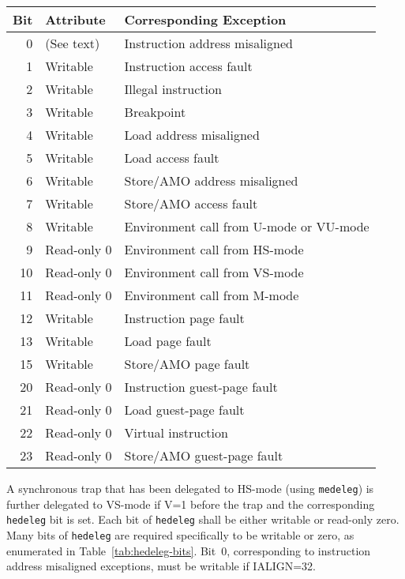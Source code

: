 \begin{table*}[h!]
\begin{center}
\begin{tabular}{|r|l|l|}
\hline
Bit & Attribute   & Corresponding Exception \\
\hline
 0  & (See text)  & Instruction address misaligned \\
 1  & Writable    & Instruction access fault \\
 2  & Writable    & Illegal instruction \\
 3  & Writable    & Breakpoint \\
 4  & Writable    & Load address misaligned \\
 5  & Writable    & Load access fault \\
 6  & Writable    & Store/AMO address misaligned \\
 7  & Writable    & Store/AMO access fault \\
 8  & Writable    & Environment call from U-mode or VU-mode \\
 9  & Read-only 0 & Environment call from HS-mode \\
10  & Read-only 0 & Environment call from VS-mode \\
11  & Read-only 0 & Environment call from M-mode \\
12  & Writable    & Instruction page fault \\
13  & Writable    & Load page fault \\
15  & Writable    & Store/AMO page fault \\
20  & Read-only 0 & Instruction guest-page fault \\
21  & Read-only 0 & Load guest-page fault \\
22  & Read-only 0 & Virtual instruction \\
23  & Read-only 0 & Store/AMO guest-page fault \\
\hline
\end{tabular}
\end{center}
\caption{Bits of {\tt hedeleg} that must be writable or must be read-only
zero.}
\label{tab:hedeleg-bits}
\end{table*}

A synchronous trap that has been delegated to HS-mode (using
{\tt medeleg}) is further delegated to VS-mode if V=1 before the trap and
the corresponding {\tt hedeleg} bit is set.
Each bit of {\tt hedeleg} shall be either writable or read-only zero.
Many bits of {\tt hedeleg} are required specifically to be writable or
zero, as enumerated in Table~\ref{tab:hedeleg-bits}.
Bit~0, corresponding to instruction address misaligned exceptions, must
be writable if IALIGN=32.

